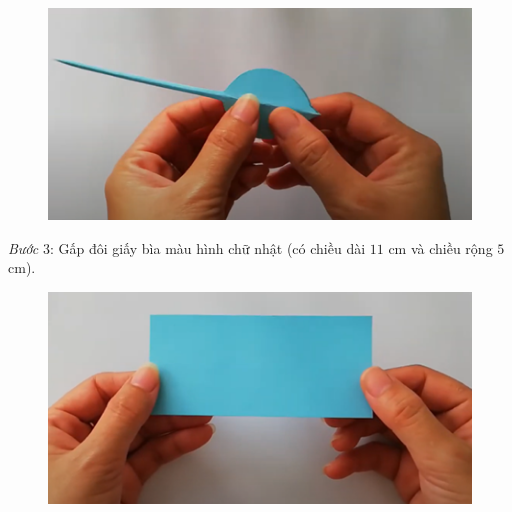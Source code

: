\begin{multicols}{2}
\begin{figure}[H]
		\vspace*{1pt}
		\hspace*{1pt}\includegraphics[width=0.7\linewidth]{66}
		\vspace*{-10pt}
	\end{figure}
	\textit{Bước} $3$: Gấp đôi giấy bìa màu hình chữ nhật (có chiều dài $11$ cm và chiều rộng $5$ cm).
	\begin{figure}[H]
		\vspace*{-5pt}
		\centering
		\captionsetup{labelformat= empty, justification=centering}
		\includegraphics[width=0.7\linewidth]{67}
		

\end{figure}
\end{multicols}
